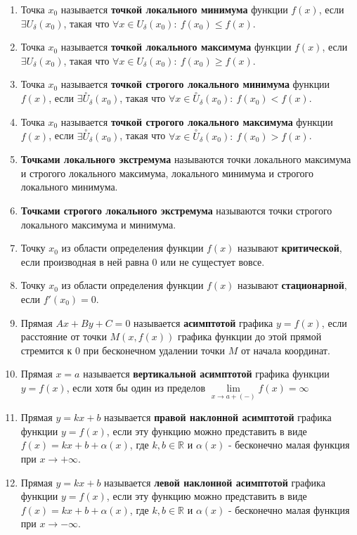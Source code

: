 \begin{enumerate}
\item Точка $x_0$ называется \textbf{точкой локального минимума} функции $f(x)$, если $\exists U_{\delta}(x_0)$, такая что $\forall x \in U_{\delta}(x_0): \ f(x_0) \leqslant f(x)$.
\item Точка $x_0$ называется \textbf{точкой локального максимума} функции $f(x)$, если $\exists U_{\delta}(x_0)$, такая что $\forall x \in U_{\delta}(x_0): \ f(x_0) \geqslant f(x)$.
\item Точка $x_0$ называется \textbf{точкой строгого локального минимума} функции $f(x)$, если $\exists \overset{\circ}{U}_{\delta}(x_0)$, такая что $\forall x \in \overset{\circ}{U}_{\delta}(x_0): \ f(x_0) < f(x)$.
\item Точка $x_0$ называется \textbf{точкой строгого локального максимума} функции $f(x)$, если $\exists \overset{\circ}{U}_\delta(x_0)$, такая что $\forall x \in \overset{\circ}{U}_\delta(x_0): \ f(x_0) > f(x)$.
\item \textbf{Точками локального экстремума} называются точки локального максимума и строгого локального максимума, локального минимума и строгого локального минимума.
\item \textbf{Точками строгого локального экстремума} называются точки строгого локального максимума и минимума.
\item Точку $x_0$ из области определения функции $f(x)$ называют \textbf{критической}, если производная в ней равна 0 или не сущестует вовсе.
\item Точку $x_0$ из области определения функции $f(x)$ называют \textbf{стационарной}, если $f'(x_0) = 0$.
\item Прямая $Ax + By + C = 0$ называется \textbf{асимптотой} графика $y = f(x)$, если расстояние от точки $M(x, f(x))$ графика функции до этой прямой стремится к 0 при бесконечном удалении точки $M$ от начала координат.
\item Прямая $x = a$ называется \textbf{вертикальной асимптотой} графика функции $y = f(x)$, если хотя бы один из пределов $\lim\limits_{x \to a+(-)}f(x) = \infty$
\item Прямая $y = kx + b$ называется \textbf{правой наклонной асимптотой} графика функции $y = f(x)$, если эту функцию можно представить в виде $f(x) = kx + b + \alpha(x)$, где $k, b \in \mathbb{R}$ и $\alpha(x)$ - бесконечно малая функция при $x \rightarrow +\infty$.
\item Прямая $y = kx + b$ называется \textbf{левой наклонной асимптотой} графика функции $y = f(x)$, если эту функцию можно представить в виде $f(x) = kx + b + \alpha(x)$, где $k, b \in \mathbb{R}$ и $\alpha(x)$ - бесконечно малая функция при $x \rightarrow -\infty$.

\end{enumerate}
